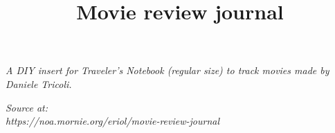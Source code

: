 \documentclass[11pt, a4paper]{article}
\title{Movie review journal}
\date{}
\author{}
\begin{document}
    \vspace*{\fill}
    \emph{A DIY insert for Traveler's Notebook (regular size) to track movies
    made by Daniele Tricoli.}

    \emph{Source at: \\ https://noa.mornie.org/eriol/movie-review-journal}
    \pagebreak

    \maketitle

    \begin{figure}[h!]
        \centering
        
    \end{figure}
    \pagebreak

\end{document}
